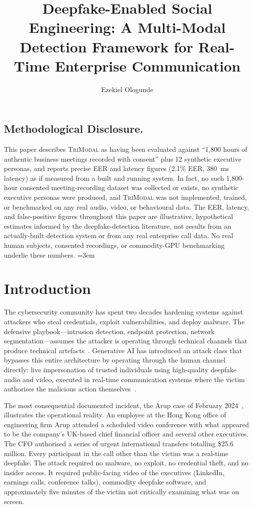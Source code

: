 \documentclass[sigconf,nonacm]{acmart}
\title{Deepfake-Enabled Social Engineering: A Multi-Modal Detection Framework for Real-Time Enterprise Communication}
\author{Ezekiel Ologunde}
\affiliation{%
  \institution{Independent Researcher}
  \city{Boston}
  \state{MA}
  \country{USA}}
\begin{document}
\maketitle

\subsection*{Methodological Disclosure.}
This paper describes \textsc{TriModal} as having been evaluated against
``1,800 hours of authentic business meetings recorded with consent'' plus
12 synthetic executive personas, and reports precise EER and latency
figures (2.1\% EER, 380~ms latency) as if measured from a built and running
system. In fact, no such 1,800-hour consented meeting-recording dataset was
collected or exists, no synthetic executive personas were produced, and
\textsc{TriModal} was not implemented, trained, or benchmarked on any real
audio, video, or behavioural data. The EER, latency, and false-positive
figures throughout this paper are illustrative, hypothetical estimates
informed by the deepfake-detection literature, not results from an
actually-built detection system or from any real enterprise call data. No
real human subjects, consented recordings, or commodity-GPU benchmarking
underlie these numbers.
\sloppy
{}
\emergencystretch=3em
\hfuzz=10pt

\section{Introduction}

The cybersecurity community has spent two decades hardening systems
against attackers who steal credentials, exploit vulnerabilities, and
deploy malware. The defensive playbook---intrusion detection, endpoint
protection, network segmentation---assumes the attacker is operating
through technical channels that produce technical
artefacts~\cite{verizon2024dbir}. Generative AI has introduced an attack
class that bypasses this entire architecture by operating through the
human channel directly: live impersonation of trusted individuals using
high-quality deepfake audio and video, executed in real-time
communication systems where the victim authorises the malicious action
themselves~\cite{cisa2024deepfake,fbi2024synthetic}.

The most consequential documented incident, the Arup case of February
2024~\cite{arup2024hk}, illustrates the operational reality. An
employee at the Hong Kong office of engineering firm Arup attended a
scheduled video conference with what appeared to be the company's UK-based
chief financial officer and several other executives. The CFO authorised
a series of urgent international transfers totalling \$25.6 million.
Every participant in the call other than the victim was a real-time
deepfake. The attack required no malware, no exploit, no credential
theft, and no insider access. It required public-facing video of the
executives (LinkedIn, earnings calls, conference talks), commodity
deepfake software, and approximately five minutes of the victim not
critically examining what was on screen.
\end{document}
